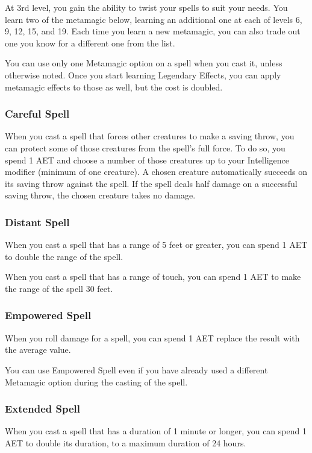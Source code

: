 At 3rd level, you gain the ability to twist your spells to suit your needs. You learn two of the metamagic below, learning an additional one at each of levels 6, 9, 12, 15, and 19. Each time you learn a new metamagic, you can also trade out one you know for a different one from the list.

You can use only one Metamagic option on a spell when you cast it, unless otherwise noted. Once you start learning Legendary Effects, you can apply metamagic effects to those as well, but the cost is doubled.

\subsubsection{Careful Spell}

When you cast a spell that forces other creatures to make a saving throw, you can protect some of those creatures from the spell's full force. To do so, you spend 1 AET and choose a number of those creatures up to your Intelligence modifier (minimum of one creature). A chosen creature automatically succeeds on its saving throw against the spell. If the spell deals half damage on a successful saving throw, the chosen creature takes no damage.

\subsubsection{Distant Spell}

When you cast a spell that has a range of 5 feet or greater, you can spend 1 AET to double the range of the spell.

When you cast a spell that has a range of touch, you can spend 1 AET to make the range of the spell 30 feet.

\subsubsection{Empowered Spell}

When you roll damage for a spell, you can spend 1 AET replace the result with the average value.

You can use Empowered Spell even if you have already used a different Metamagic option during the casting of the spell.

\subsubsection{Extended Spell}

When you cast a spell that has a duration of 1 minute or longer, you can spend 1 AET to double its duration, to a maximum duration of 24 hours.

